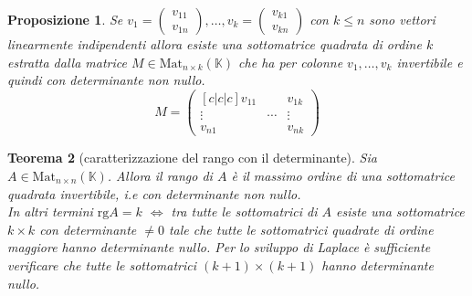 \documentclass[9pt, a4paper]{article}
\newcommand{\K}{\mathbb{K}}
\newcommand{\rg}{\mathrm{rg}}
\theoremstyle{mythm}
\newtheorem{thm}{Teorema}[section]
\newtheorem{prop}[thm]{Proposizione}
\begin{document}
\begin{prop}
	Se $ v_1 = \begin{pmatrix} v_{11} \\ v_{1n} \end{pmatrix}, \ldots, v_k = \begin{pmatrix} v_{k1} \\ v_{kn} \end{pmatrix} $ con $ k \leq n $ sono vettori linearmente \emph{indipendenti} allora esiste una sottomatrice quadrata di ordine $ k $ estratta dalla matrice $ M \in \mathrm{Mat}_{n \times k} (\K) $ che ha per colonne $ v_1, \ldots, v_k $ invertibile e quindi con determinante non nullo. 
	\[M = \begin{pmatrix}[c|c|c]
	v_{11} & & v_{1k} \\
	\vdots & \cdots & \vdots \\
	v_{n1} & & v_{nk}
	\end{pmatrix}\]
\end{prop}

\begin{thm}[caratterizzazione del rango con il determinante]
	Sia $ A \in \mathrm{Mat}_{n \times n} (\K) $. Allora il rango di $ A $ è il massimo ordine di una sottomatrice quadrata invertibile, i.e con determinante non nullo. \\
	In altri termini $ \rg A = k $ $ \iff $ tra tutte le sottomatrici di $ A $ esiste una sottomatrice $ k \times k $ con determinante $ \neq 0 $ tale che tutte le sottomatrici quadrate di ordine maggiore hanno determinante nullo. Per lo sviluppo di Laplace è sufficiente verificare che tutte le sottomatrici $ (k + 1) \times (k + 1) $ hanno determinante nullo. 
\end{thm}
\end{document}
